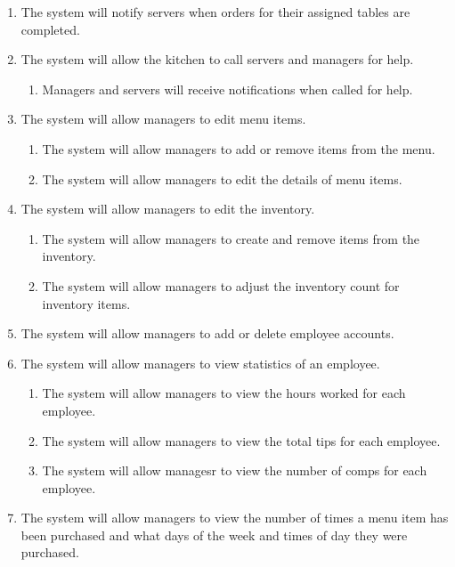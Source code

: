 \documentclass[12pt]{article}
\begin{document}
\begin{enumerate}
			\item The system will notify servers when orders for their assigned tables are completed.

			\item The system will allow the kitchen to call servers and managers for help.
				\begin{enumerate}
					\item Managers and servers will receive notifications when called for help.
				\end{enumerate}

			\item The system will allow managers to edit menu items.
				\begin{enumerate}
					\item The system will allow managers to add or remove items from the menu.
					\item The system will allow managers to edit the details of menu items.
				\end{enumerate}

			\item The system will allow managers to edit the inventory.
				\begin{enumerate}
					\item The system will allow managers to create and remove items from the inventory.
					\item The system will allow managers to adjust the inventory count for inventory items.
				\end{enumerate}

			\item The system will allow managers to add or delete employee accounts.

			\item The system will allow managers to view statistics of an employee.
				\begin{enumerate}
					\item The system will allow managers to view the hours worked for each employee.
					\item The system will allow managers to view the total tips for each employee.
					\item The system will allow managesr to view the number of comps for each employee.
				\end{enumerate}

			\item The system will allow managers to view the number of times a menu item has been purchased and what days of the week and times of day they were purchased.


\end{enumerate}
\end{document}
